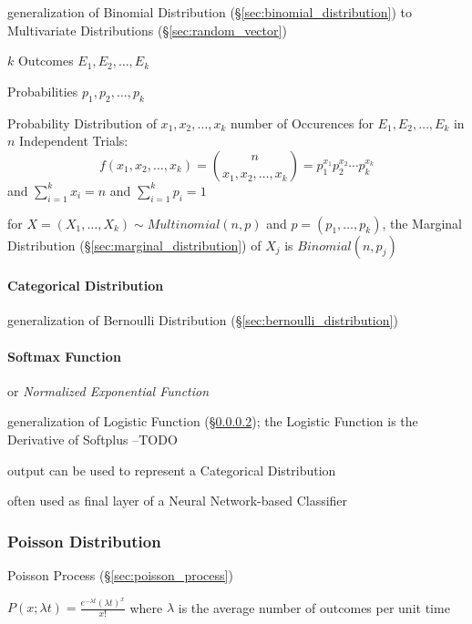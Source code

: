 generalization of Binomial Distribution (\S\ref{sec:binomial_distribution}) to
Multivariate Distributions (\S\ref{sec:random_vector})

$k$ Outcomes $E_1, E_2, \ldots, E_k$

Probabilities $p_1, p_2, \ldots, p_k$

Probability Distribution of $x_1, x_2, \ldots, x_k$ number of
Occurences for $E_1, E_2, \ldots, E_k$ in $n$ Independent Trials:
\[
  f(x_1, x_2, \ldots, x_k) = \binom{n}{x_1, x_2, \ldots, x_k} =
  p_1^{x_1} p_2^{x_2} \cdots p_k^{x_k}
\]
and $\sum_{i=1}^k x_i = n$ and $\sum_{i=1}^k {p_i} = 1$

for $X = (X_1, \ldots, X_k) \sim Multinomial(n, p)$ and
$p = (p_1, \ldots, p_k)$, the Marginal Distribution
(\S\ref{sec:marginal_distribution}) of $X_j$ is $Binomial (n, p_j)$



\paragraph{Categorical Distribution}\label{sec:categorical_distribution}
\hfill

generalization of Bernoulli Distribution (\S\ref{sec:bernoulli_distribution})



\paragraph{Softmax Function}\label{sec:softmax}
\hfill

or \emph{Normalized Exponential Function}

generalization of Logistic Function (\S\ref{sec:softmax}); the Logistic Function
is the Derivative of Softplus --TODO

output can be used to represent a Categorical Distribution

often used as final layer of a Neural Network-based Classifier



\subsubsection{Poisson Distribution}\label{sec:poisson_distribution}

Poisson Process (\S\ref{sec:poisson_process})

$P(x; \lambda t) = \frac{e^{-\lambda t} (\lambda t)^x}{x!}$
where $\lambda$ is the average number of outcomes per unit time

